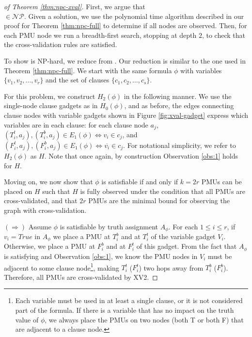 \begin{proof}[of Theorem \ref{thm:npc-xval}]
First, we argue that \\ 
\xval $\in \mathcal{NP}$.  Given a \xval solution, we use
the polynomial time algorithm described in our proof for Theorem
\ref{thm:npc-full} to determine if all nodes are observed.  Then, for each
PMU node we run a breadth-first search, stopping at depth $2$, to check that
the cross-validation rules are satisfied.

To show \xval is NP-hard, we reduce from \sats.  Our reduction is similar to
the one used in Theorem \ref{thm:npc-full}.  We start with the same \sat formula $\phi$ with variables $\{v_1,v_2, \dots , v_r\}$ and the set of clauses $\{c_1,c_2,\dots , c_s \}$.

For this problem, we construct $H_2(\phi)$ in the following manner. We use the single-node clause gadgets  as in $H_0(\phi)$, and as before, the edges connecting clause nodes with variable gadgets shown in Figure \ref{fig:xval-gadget} express which variables are in each clause: for each clause node $a_j$, $(T^t_i, a_j),(T^b_i, a_j)\in E_1(\phi) \Leftrightarrow v_i\in c_j$, and $(F^t_i, a_j),(F^b_i, a_j)\in E_1(\phi) \Leftrightarrow \overline{v_i}\in c_j$. For notational simplicity, we refer to $H_2(\phi)$ as $H$. Note that once again, by construction Observation \ref{obs:1} holds for $H$.

Moving on, we now show that $\phi$ is satisfiable if and only if
$k=2r$ PMUs can be placed on $H$ such that $H$ is fully observed under the
condition that all PMUs are cross-validated, and that $2r$ PMUs are the minimal
bound for observing the graph with cross-validation.

$(\Rightarrow)$ Assume $\phi$ is satisfiable by truth assignment $A_{\phi}$.
For each $1\leq i\leq r$, if $v_i=True$ in $A_{\phi}$ we place a PMU at $T_i^b$
and at $T_i^t$ of the variable gadget $V_i$. Otherwise, we place a PMU at $F_i^b$
and at $F_i^t$ of this gadget. From the fact that $A_{\phi}$ is satisfying and Observation \ref{obs:1}, we know the PMU nodes in $V_i$ must be
adjacent to some clause node\footnote{Each variable must be used in at least a single clause, or it is not considered part of the formula. If there is a variable that has no impact on the truth value of $\phi$, we always place the PMUs on two nodes (both T or both F) that are adjacent to a clause node.}, making $T_i^t$ ($F_i^t$) two hops away from
$T_i^b$ ($F_i^b$). Therefore, all PMUs are cross-validated by XV2.


\end{proof}
